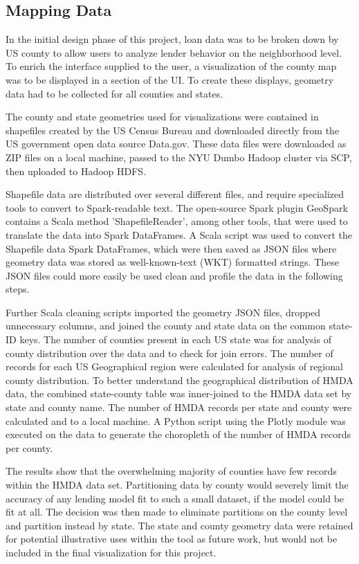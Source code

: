 \documentclass[conference,compsoc]{IEEEtran}
\begin{document}
\subsection{Mapping Data}

In the initial design phase of this project, loan data was to be broken down by US county to allow users to analyze lender behavior on the neighborhood level. To enrich the interface supplied to the user, a visualization of the county map was to be displayed in a section of the UI. To create these displays, geometry data had to be collected for all counties and states. 

The county and state geometries used for visualizations were contained in shapefiles created by the US Census Bureau and downloaded directly from the US government open data source Data.gov. These data files were downloaded as ZIP files on a local machine, passed to the NYU Dumbo Hadoop cluster via SCP, then uploaded to Hadoop HDFS. 

Shapefile data are distributed over several different files, and require specialized tools to convert to Spark-readable text. The open-source Spark plugin GeoSpark contains a Scala method 'ShapefileReader', among other tools, that were used to translate the data into Spark DataFrames. A Scala script was used to convert the Shapefile data Spark DataFrames, which were then saved as JSON files where geometry data was stored as well-known-text (WKT) formatted strings. These JSON files could more easily be used clean and profile the data in the following steps.

Further Scala cleaning scripts imported the geometry JSON files, dropped unnecessary columns, and joined the county and state data on the common state-ID keys. The number of counties present in each US state was for analysis of county distribution over the data and to check for join errors. The number of records for each US Geographical region were calculated for analysis of regional county distribution.
To better understand the geographical distribution of HMDA data, the combined state-county table was inner-joined to the HMDA data set by state and county name. The number of HMDA records per state and county were calculated and to a local machine. A Python script using the Plotly module was executed on the data to generate the choropleth of the number of HMDA records per county. 

The results show that the overwhelming majority of counties have few records within the HMDA data set. Partitioning data by county would severely limit the accuracy of any lending model fit to such a small dataset, if the model could be fit at all. The decision was then made to eliminate partitions on the county level and partition instead by state. The state and county geometry data were retained for potential illustrative uses within the tool as future work, but would not be included in the final visualization for this project. 
\end{document}
